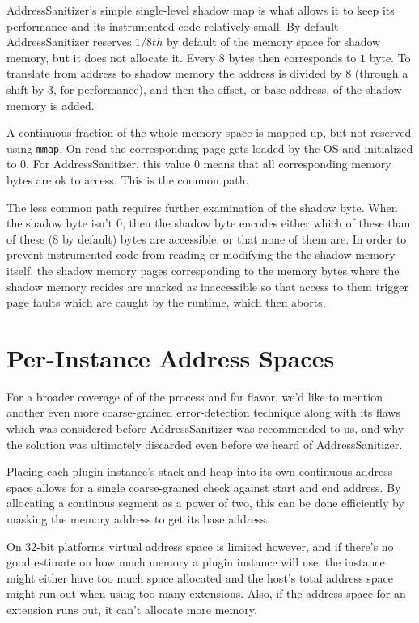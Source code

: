 AddressSanitizer's simple single-level shadow map is what allows it to keep its
performance and its instrumented code relatively small.
By default AddressSanitizer reserves $1/8th$ by default of the memory space for
shadow memory, but it does not allocate it.
Every $8$ bytes then corresponds to $1$ byte.
To translate from address to shadow memory the address is divided by $8$
(through a shift by $3$, for performance), and then the offset, or base address,
of the shadow memory is added.

A continuous fraction of the whole memory space is mapped up, but not reserved
using \texttt{mmap}.
On read the corresponding page gets loaded by the OS and initialized to $0$.
For AddressSanitizer, this value $0$ means that all corresponding memory bytes
are ok to access.
This is the common path.

The less common path requires further examination of the shadow byte.
When the shadow byte isn't $0$, then the shadow byte encodes either which of
these than of these ($8$ by default) bytes are accessible, or that none of them
are.
In order to prevent instrumented code from reading or modifying the the shadow
memory itself, the shadow memory pages corresponding to the memory bytes where
the shadow memory recides are marked as inaccessible so that access to them
trigger page faults which are caught by the runtime, which then aborts.


\section {Per-Instance Address Spaces}

For a broader coverage of of the process and for flavor, we'd like to mention
another even more coarse-grained error-detection technique along with its flaws
which was considered before AddressSanitizer was recommended to us, and why the
solution was ultimately discarded even before we heard of AddressSanitizer.

Placing each plugin instance's stack and heap into its own continuous address
space allows for a single coarse-grained check against start and end address. By
allocating a continous segment as a power of two, this can be done efficiently
by masking the memory address to get its base address.

On 32-bit platforms virtual address space is limited however, and if there's no
good estimate on how much memory a plugin instance will use, the instance might
either have too much space allocated and the host's total address space
might run out when using too many extensions. Also, if the address space for an
extension runs out, it can't allocate more memory.

